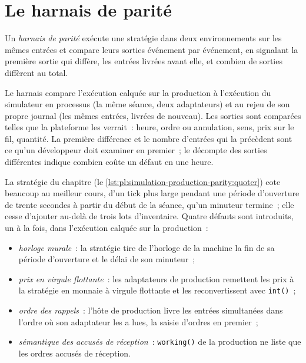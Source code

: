 \label{lst:pl:simulation-production-parity:prod}

\section{Le harnais de parité}

\begin{definition}\label{def:pl:simulation-production-parity:harness}
Un \emph{harnais de parité} exécute une stratégie dans deux environnements sur les mêmes entrées et compare leurs sorties
événement par événement, en signalant la première sortie qui diffère, les entrées livrées avant elle, et combien de sorties diffèrent au total.
\end{definition}

Le harnais compare l'exécution calquée sur la production à l'exécution du simulateur en processus (la même séance, deux adaptateurs) et au rejeu de
son propre journal (les mêmes entrées, livrées de nouveau). Les sorties sont comparées telles que la plateforme les verrait~: heure, ordre ou annulation, sens, prix sur
le fil, quantité. La première différence et le nombre d'entrées qui la précèdent sont ce qu'un développeur doit examiner en premier~; le décompte des
sorties différentes indique combien coûte un défaut en une heure.

\label{lst:pl:simulation-production-parity:compare}

La stratégie du chapitre (le \cref{lst:pl:simulation-production-parity:quoter}) cote beaucoup au meilleur cours, d'un tick plus large pendant une
période d'ouverture de trente secondes à partir du début de la séance, qu'un minuteur termine~; elle cesse d'ajouter au-delà de trois lots d'inventaire. Quatre défauts sont
introduits, un à la fois, dans l'exécution calquée sur la production~:
\begin{itemize}
\item \emph{horloge murale}~: la stratégie tire de l'horloge de la machine la fin de sa période d'ouverture et le délai de son minuteur~;
\item \emph{prix en virgule flottante}~: les adaptateurs de production remettent les prix à la stratégie en monnaie à virgule flottante et les reconvertissent
avec \texttt{int()}~;
\item \emph{ordre des rappels}~: l'hôte de production livre les entrées simultanées dans l'ordre où son adaptateur les a lues, la saisie d'ordres en premier~;
\item \emph{sémantique des accusés de réception}~: \texttt{working()} de la production ne liste que les ordres accusés de réception.
\end{itemize}

